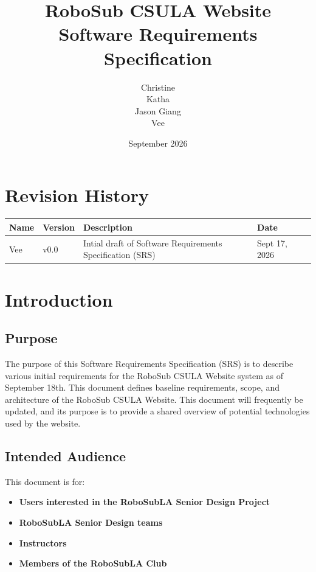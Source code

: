 \documentclass[12pt]{article}
\title{RoboSub CSULA Website\\
Software Requirements Specification}
\author{
	Christine\\
	Katha \\
	Jason Giang \\ 
	Vee\\
	}
\date{September 2026}
\begin{document}
 

\begin{titlepage} 
\maketitle
\thispagestyle{empty} 
\end{titlepage} 

\thispagestyle{empty} 
\tableofcontents 
\newpage

\section*{Revision History} 
\begin{center} 
\begin{tabular}{|p{3cm}|p{3cm}|p{3cm}|p{3cm}|p{3cm}|}
\hline
\textbf{Name} & \textbf{Version} & \textbf{Description} & \textbf{Date}\\ 
\hline
Vee & v0.0 & Intial draft of Software Requirements Specification (SRS) & Sept 17, 2026\\
\hline

\end{tabular} 
\end{center} 

\newpage
\section{Introduction} 

\subsection{Purpose} 
The purpose of this Software Requirements Specification (SRS) is to describe various initial requirements for the RoboSub CSULA Website system as of September 18th. This document defines baseline requirements, scope, and architecture of the RoboSub CSULA Website. This document will frequently be updated, and its purpose is to provide a shared overview of potential technologies used by the website.

\subsection{Intended Audience} 
This document is for: 
\begin{itemize} 
	\item \textbf{Users interested in the RoboSubLA Senior Design Project} 
	\item \textbf{RoboSubLA Senior Design teams} 
	\item \textbf{Instructors} 
	\item \textbf{Members of the RoboSubLA Club} 
\end{itemize} 
\end{document}
